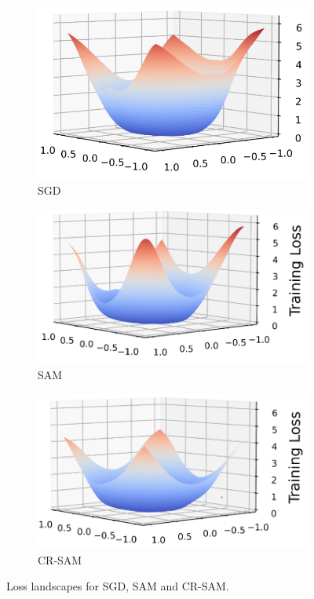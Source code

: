 \documentclass[letterpaper]{article} %
\theoremstyle{plain}
\theoremstyle{definition}
\begin{document}
\begin{figure}[h]

    \centering
    \begin{subfigure}[b]{0.27\linewidth}
        \centering
        \includegraphics[width=0.8\linewidth]{figs/SGD_loss.png}
        \vspace{-5px}
        \caption{SGD}
        \label{fig:sgd}
    \end{subfigure}
    \hfill
    \begin{subfigure}[b]{0.3\linewidth}
        \centering
        \includegraphics[width=0.8\linewidth]{figs/SAM_loss.png}
        \vspace{-5px}
        \caption{SAM}
        \label{fig:sam}
    \end{subfigure}
    \hfill
    \begin{subfigure}[b]{0.3\linewidth}
        \centering
        \includegraphics[width=0.8\linewidth]{figs/CRSAM_loss.png}
        \vspace{-5px}
        \caption{CR-SAM}
        \label{fig:sam-GAM}
    \end{subfigure}
    \caption{Loss landscapes for SGD, SAM and CR-SAM.}
    \label{fig:vis}
    \vspace{-0.5cm}
\end{figure}
\end{document}
